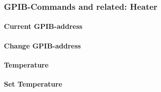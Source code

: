 \documentclass[a4paper,12pt]{article}
\begin{document}
\subsubsection{GPIB-Commands and related: Heater}

\paragraph{Current GPIB-address}

\paragraph{Change GPIB-address}

\paragraph{Temperature}

\paragraph{Set Temperature}







%
%


\end{document}
